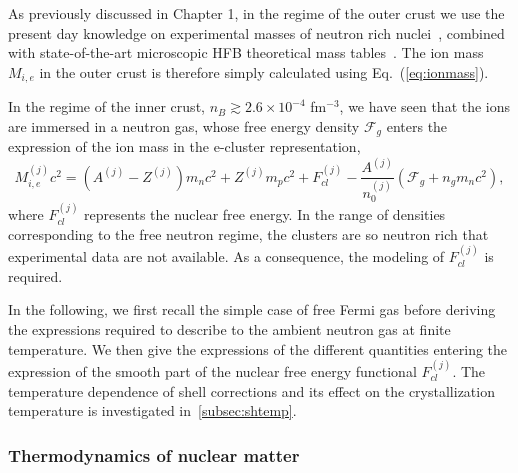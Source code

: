 As previously discussed in Chapter 1, in the regime of the outer crust we use 
the present day knowledge on experimental masses of neutron rich 
nuclei~\cite{Huang2017,Welker2017}, combined with state-of-the-art 
microscopic HFB theoretical mass tables~\cite{Goriely2013}. The ion mass 
$M_{i,e}$ in the outer crust is therefore simply calculated using 
Eq.~(\ref{eq:ionmass}).

In the regime of the inner crust, $n_B \gtrsim 2.6 \times 10^{-4}$ fm$^{-3}$, 
we have seen that the ions are immersed in a neutron gas, whose free energy 
density $\mathcal{F}_g$ enters the expression of the ion mass in the e-cluster 
representation,
%
\begin{equation}
  M_{i,e}^{(j)} c^2 = (A^{(j)} - Z^{(j)})m_n c^2 + Z^{(j)} m_p c^2 
  + F_{cl}^{(j)} - \frac{A^{(j)}}{n_0^{(j)}}(\mathcal{F}_g + n_g m_n c^2),
\end{equation}
%
where $F_{cl}^{(j)}$ represents the nuclear free energy.
In the range of densities corresponding to the free neutron regime, the 
clusters are so neutron rich that experimental data are not available. As a 
consequence, the modeling of $F_{cl}^{(j)}$ is required.

In the following, we first recall the simple case of free Fermi gas before
deriving the expressions required to describe to the ambient neutron gas at 
finite temperature. 
We then give the expressions of the different quantities entering the 
expression of the smooth part of the nuclear free energy functional 
$F_{cl}^{(j)}$. The temperature dependence of shell corrections and its effect 
on the crystallization temperature is investigated in~\ref{subsec:shtemp}.

\subsubsection{Thermodynamics of nuclear matter}

